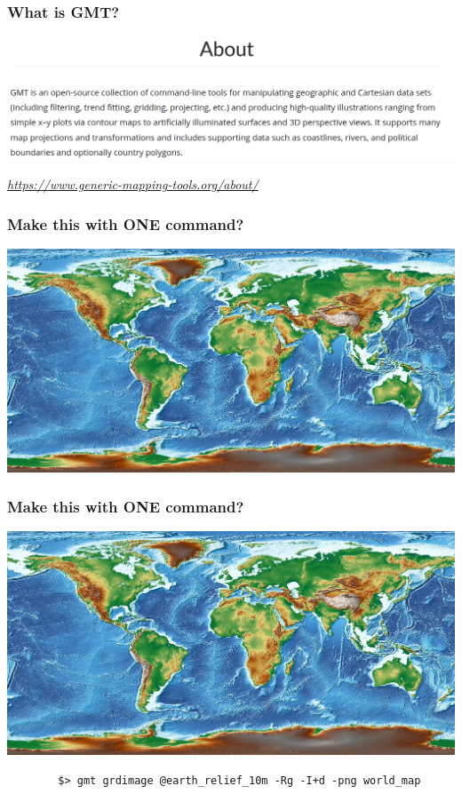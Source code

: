 \documentclass[unknownkeysallowed]{beamer}
\begin{document}
\begin{frame}
\frametitle{What is GMT?}
	\vspace{-0.25cm}
	\begin{center}
		\includegraphics[width=\textwidth]{../figures/gmt_about.png}
	\end{center}
	\begin{flushright}
	\vspace{-0.15cm}
	\tiny{\emph{\url{https://www.generic-mapping-tools.org/about/}}}
	\end{flushright}	
\end{frame}

\begin{frame}
\frametitle{Make this with ONE command?}
	\begin{center}
		\includegraphics[width=\textwidth]{../figures/gmt_world_map.png}	
	\end{center}
\end{frame}

\begin{frame}[fragile=singleslide]
\frametitle{Make this with ONE command?}
	\begin{center}
		\includegraphics[width=\textwidth]{../figures/gmt_world_map.png}	
	\end{center}

	{\scriptsize	
	\begin{verbatim}
		$> gmt grdimage @earth_relief_10m -Rg -I+d -png world_map
	\end{verbatim}
	}
\end{frame}
\end{document}
